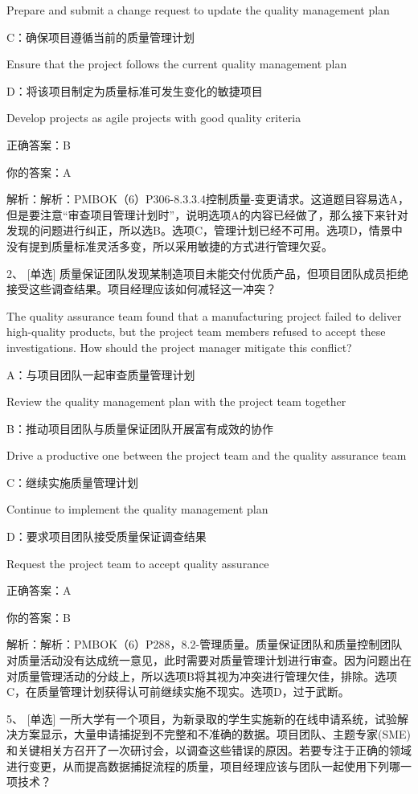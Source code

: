 Prepare and submit a change request to update the quality management plan

C：确保项目遵循当前的质量管理计划

Ensure that the project follows the current quality management plan

D：将该项目制定为质量标准可发生变化的敏捷项目

Develop projects as agile projects with good quality criteria

正确答案：B

你的答案：A

解析：解析：PMBOK（6）P306-8.3.3.4控制质量-变更请求。这道题目容易选A，但是要注意“审查项目管理计划时”，说明选项A的内容已经做了，那么接下来针对发现的问题进行纠正，所以选B。选项C，管理计划已经不可用。选项D，情景中没有提到质量标准灵活多变，所以采用敏捷的方式进行管理欠妥。


2、 [单选] 质量保证团队发现某制造项目未能交付优质产品，但项目团队成员拒绝接受这些调查结果。项目经理应该如何减轻这一冲突？

The quality assurance team found that a manufacturing project failed to deliver high-quality products, but the project team members refused to accept these investigations. How should the project manager mitigate this conflict?

A：与项目团队一起审查质量管理计划

Review the quality management plan with the project team together

B：推动项目团队与质量保证团队开展富有成效的协作

Drive a productive one between the project team and the quality assurance team

C：继续实施质量管理计划

Continue to implement the quality management plan

D：要求项目团队接受质量保证调查结果

Request the project team to accept quality assurance

正确答案：A

你的答案：B

解析：解析：PMBOK（6）P288，8.2-管理质量。质量保证团队和质量控制团队对质量活动没有达成统一意见，此时需要对质量管理计划进行审查。因为问题出在对质量管理活动的分歧上，所以选项B将其视为冲突进行管理欠佳，排除。选项C，在质量管理计划获得认可前继续实施不现实。选项D，过于武断。



5、 [单选] 一所大学有一个项目，为新录取的学生实施新的在线申请系统，试验解决方案显示，大量申请捕捉到不完整和不准确的数据。项目团队、主题专家(SME)和关键相关方召开了一次研讨会，以调查这些错误的原因。若要专注于正确的领域进行变更，从而提高数据捕捉流程的质量，项目经理应该与团队一起使用下列哪一项技术？

